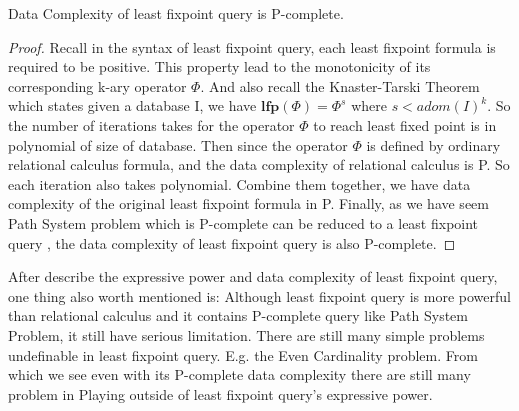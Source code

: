 \begin{claim}
Data Complexity of least fixpoint query is P-complete.
\end{claim}
\begin{proof}
Recall in the syntax of least fixpoint query, each least fixpoint formula is required to be positive. This property lead to the monotonicity of its corresponding k-ary operator $\Phi$. And also recall the Knaster-Tarski Theorem which states given a database I, we have $\textbf{lfp}(\Phi)=\Phi^s$ where $s<adom(I)^k$. So the number of iterations takes for the operator $\Phi$ to reach least fixed point is in polynomial of size of database. Then since the operator $\Phi$ is defined by ordinary relational calculus formula, and the data complexity of relational calculus is P. So each iteration also takes polynomial. Combine them together, we have data complexity of the original least fixpoint formula in P. Finally, as we have seem Path System problem which is P-complete can be reduced to a least fixpoint query , the data complexity of least fixpoint query is also P-complete. 
\end{proof}

After describe the expressive power and data complexity of least fixpoint query, one thing also worth mentioned is: Although least fixpoint query is more powerful than relational calculus and it contains P-complete query like Path System Problem, it still have serious limitation. There are still many simple problems undefinable in least fixpoint query. E.g. the Even Cardinality problem\cite{kolaitis1}. From which we see even with its P-complete data complexity there are still many problem in Playing outside of least fixpoint query's expressive power.